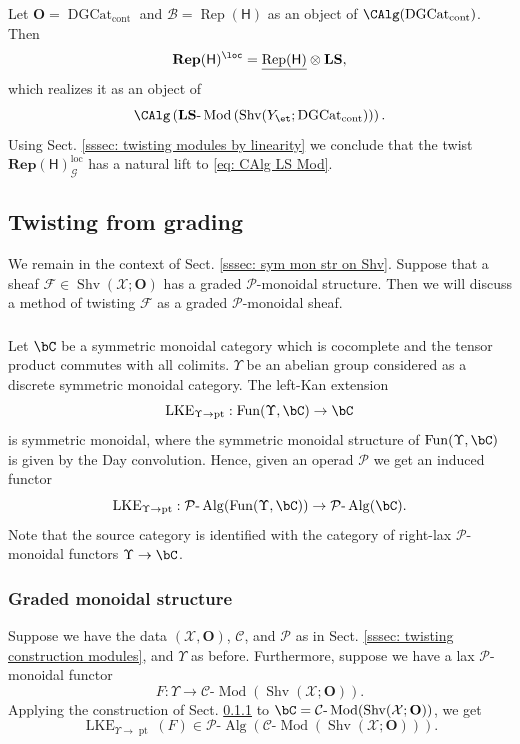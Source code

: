 \documentclass[10pt]{amsart}
\newcommand{\sssec}{\subsubsection}
\theoremstyle{remark}
\newcommand{\ul}{\underline}
\newcommand{\cP}{\mathcal{P}}
\newcommand{\on}{\operatorname}
\newcommand{\cB}{\mathcal{B}}
\newcommand{\cC}{\mathcal{C}}
\newcommand{\cF}{\mathcal{F}}
\newcommand{\cG}{\mathcal{G}}
\newcommand{\cX}{\mathcal{X}}
\newcommand{\DGcat}{\on{DGCat}_{\on{cont}}}
\newcommand{\lMod}{\text{-}\on{Mod}}
\newcommand{\lAlg}{\text{-}\on{Alg}}
\newcommand{\Rep}{\on{Rep}}
\newcommand{\Shv}{\on{Shv}}
\newcommand{\Fun}{\on{Fun}}
\newcommand{\bO}{\mathbf{O}}
\newcommand{\pt}{\on{pt}}
\begin{document}
Let $\bO=\DGcat$ and $\cB=\Rep(\mathsf{H})$ as an object of $\CAlg(\DGcat)$. Then 
\[\mathbf{Rep}(\mathsf{H})^{\loc}=\ul{\Rep(\mathsf{H})}\otimes \mathbf{LS},\]
which realizes it as an object of 
\begin{equation}\label{eq: CAlg LS Mod}
\CAlg\left(\mathbf{LS}\lMod\left(\Shv(Y_{\et};\DGcat)\right)\right).
\end{equation}
Using Sect. \ref{sssec: twisting modules by linearity} we conclude that the twist
$\mathbf{Rep}(\mathsf{H})^{\on{loc}}_{\cG}$
has a natural lift to \eqref{eq: CAlg LS Mod}.




\subsection{Twisting from grading}\label{ssec: twisting from grading}
We remain in the context of Sect. \ref{sssec: sym mon str on Shv}.
Suppose that a sheaf $\cF\in \Shv(\cX;\bO)$ has a graded $\cP$-monoidal structure. Then we will discuss a method of twisting $\cF$ as a graded $\cP$-monoidal sheaf.

\sssec{}\label{sssec: LKE sym mon}
Let $\bC$ be a symmetric monoidal category which is cocomplete and the tensor product commutes with all colimits. $\Upsilon$ be an abelian group considered as a discrete symmetric monoidal category. The left-Kan extension
\[\on{LKE}_{\Upsilon\rightarrow\pt}:\Fun(\Upsilon,\bC)\rightarrow \bC\]
is symmetric monoidal, where the symmetric monoidal structure of $\Fun(\Upsilon,\bC)$ is given by the Day convolution. Hence, given an operad $\cP$ we get an induced functor
\begin{equation}\label{eq: LKE graded monoidal}
    \on{LKE}_{\Upsilon\rightarrow\pt}:\cP\lAlg(\Fun(\Upsilon,\bC))\rightarrow\cP\lAlg(\bC).
\end{equation}
Note that the source category is identified with the category of right-lax $\cP$-monoidal functors $\Upsilon\rightarrow \bC$.

\sssec{Graded monoidal structure}\label{sssec: graded monoidal structure}
Suppose we have the data $(\cX,\bO)$, $\cC$, and $\cP$ as in Sect. \ref{sssec: twisting construction modules}, and $\Upsilon$ as before. Furthermore, suppose we have a lax $\cP$-monoidal functor
\[F:\Upsilon\rightarrow \cC\lMod(\Shv(\cX;\bO)).\]
Applying the construction of Sect. \ref{sssec: LKE sym mon} to $\bC=\cC\lMod(\Shv(\cX;\bO))$, we get \[\on{LKE}_{\Upsilon\rightarrow\pt}(F)\in\cP\lAlg\left(\cC\lMod\left(\Shv(\cX;\bO)\right)\right).\] 
\end{document}
